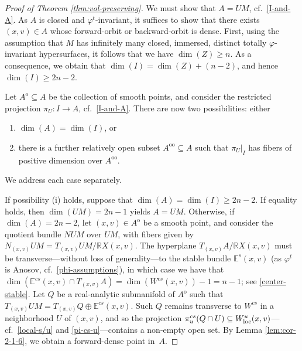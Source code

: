 \documentclass[pdftex]{sigma}
\numberwithin{equation}{section}
\theoremstyle{definition}
\begin{document}
\begin{proof}[Proof of Theorem \ref{thm:vol-preserving}]
 We must show that $A=UM$, cf.\ \eqref{I-and-A}. As $A$ is closed and \mbox{$\varphi^t$-invariant}, it suffices to show that there exists $(x,v) \in A$ whose forward-orbit or backward-orbit is dense. First, using the assumption that $M$ has infinitely many closed, immersed, distinct totally \mbox{$\varphi$-invariant} hypersurfaces, it follows that we have $\dim(Z) \geq n$. As a consequence, we obtain that \mbox{$\dim(I) = \dim(Z) + (n-2)$}, and hence $\dim(I) \geq 2n-2$.

 Let $A^{\mathrm{o}} \subseteq A$ be the collection of smooth points, and consider the restricted projection \mbox{$\pi_U \colon I \rightarrow A$}, cf.\ \eqref{I-and-A}. There are now two possibilities: either
 \begin{enumerate}[\normalfont(i)]\itemsep=0pt
\item $\dim(A) = \dim(I)$, or \item there is a further relatively open subset $A^{\mathrm{o} \mathrm{o}} \subseteq A$ such that $\pi_U|_I$ has fibers of positive dimension over $A^{\mathrm{o} \mathrm{o}}$.
\end{enumerate} We address each case separately.

 If possibility (i) holds, suppose that $\dim(A) = \dim(I) \geq 2n-2$. If equality holds, then $\dim(UM) = 2n-1$ yields $A = UM$. Otherwise, if $\dim(A) = 2n-2$, let $(x,v) \in A^{\mathrm{o}}$ be a smooth point, and consider the quotient bundle $NUM$ over $UM$, with fibers given by ${N_{(x,v)}UM = T_{(x,v)}UM/\mathbb{R}X(x,v)}$. The hyperplane $T_{(x,v)}A/\mathbb{R} X(x,v)$ must be transverse---with\-out loss of generality---to the stable bundle $\mathbb{E}^{s}(x,v)$ (as $\varphi^t$ is Anosov, cf.\ \eqref{phi-assumptions}), in which case we have that $\dim(\mathbb{E}^{cs}(x,v) \cap T_{(x,v)}A) = \dim(W^{cs}(x,v)) - 1 = n-1$; see \eqref{center-stable}. Let $Q$ be a real-analytic submanifold of $A^{\mathrm{o}}$ such that $T_{(x,v)}UM = T_{(x,v)}Q \oplus \mathbb{E}^{cs}(x,v)$. Such $Q$ remains transverse to $W^{cs}$ in a neighborhood $U$ of $(x,v)$, and so the projection $\pi_u^{cs}(Q \cap U) \subseteq W^u_{\rm loc}(x,v)$---cf.\ \eqref{local-s/u} and \eqref{pi-cs-u}---contains a non-empty open set. By Lemma \ref{lem:cor-2-1-6}, we obtain a forward-dense point in~$A$.


\end{proof}
\end{document}
